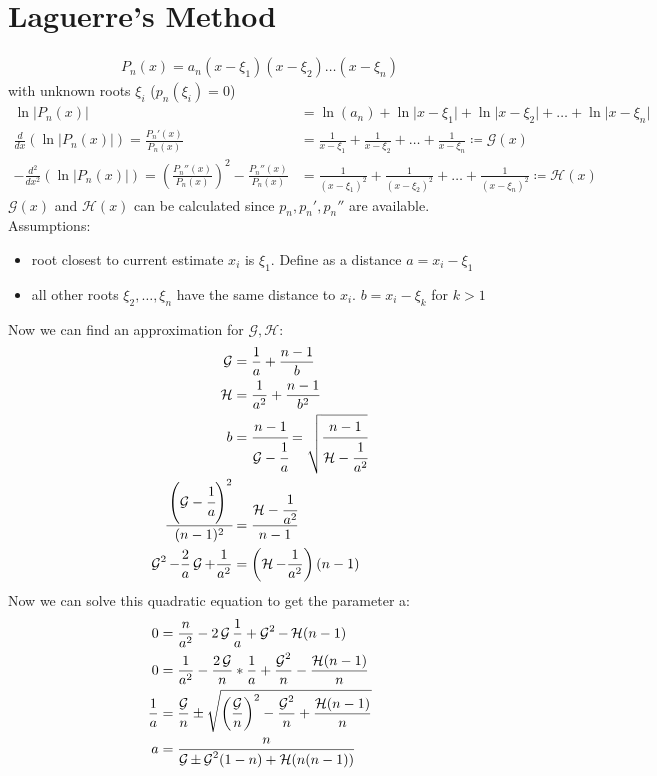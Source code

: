 \section{Laguerre's Method}\label{sec:laguerres-method}
\begin{align*}
    P_n(x) = a_n(x-\xi_1)(x-\xi_2)\ldots(x-\xi_n)
\end{align*}
with unknown roots $\xi_i$ ($p_n(\xi_i) = 0$)
\begin{align*}
    \ln | P_n(x) | &= \ln(a_n) + \ln \lvert x- \xi_1 \rvert + \ln \lvert x- \xi_2 \rvert
    +\ldots + \ln \lvert x- \xi_n \rvert\\
    \frac{d}{dx} \left( \ln \lvert P_n(x)\rvert \right) = \frac{P_n'(x)}{P_n(x)}
    &= \frac{1}{x-\xi_1}+\frac{1}{x-\xi_2}+ \ldots + \frac{1}{x-\xi_n} \coloneqq \mathcal{G}(x)\\
    -\frac{d^2}{dx^2}(\ln \lvert P_n(x) \rvert)= \left( \frac{P_n''(x)}{P_n(x)}\right)^2-\frac{P_n''(x)}{P_n(x)}
    &= \frac{1}{(x-\xi_1)^2}+\frac{1}{(x-\xi_2)^2}+\ldots+\frac{1}{(x-\xi_n)^2} \coloneqq \mathcal{H}(x)
\end{align*}
$\mathcal{G}(x)$ and $\mathcal{H}(x)$ can be calculated since $p_n, p_n', p_n''$ are available.
Assumptions:
\begin{itemize}
    \item root closest to current estimate $x_i$ is $\xi_1$.
    Define as a distance $a=x_i-\xi_1$
    \item all other roots $\xi_2, \ldots, \xi_n$ have the same distance to $x_i$. $b=x_i-\xi_k$ for $k>1$
\end{itemize}
Now we can find an approximation for $\mathcal{G}, \mathcal{H}$:
\begin{align*}
    \mathcal{G}&= \frac{1}{a}+ \frac{n-1}{b}\\
    \mathcal{H}&= \frac{1}{a^2}+\frac{n-1}{b^2}\\
    b &= \cfrac{n-1}{\mathcal{G}-\cfrac{1}{a}}= \sqrt{\cfrac{n-1}{\mathcal{H}-\cfrac{1}{a^2}}}\\
    \cfrac{\left(\mathcal{G}-\cfrac{1}{a} \right)^2}{(n-1)^2} &= \cfrac{\mathcal{H}- \cfrac{1}{a^2}}{n-1}\\
    \operatorname{\mathcal{G}}^2-\frac{2}{a}\operatorname{\mathcal{G}} + \frac{1}{a^2}&=\left(\operatorname{\mathcal{H}}-\frac{1}{a^2} \right)(n-1)\\
\end{align*}
Now we can solve this quadratic equation to get the parameter a:
\begin{align*}
    0 &=\frac{n}{a^2}-2 \operatorname{\mathcal{G}} \frac{1}{a}+ \operatorname{\mathcal{G}}^2- \operatorname{\mathcal{H}}(n-1)\\
    0 &= \frac{1}{a^2}- \frac{2 \operatorname{\mathcal{G}}}{n}*\frac{1}{a}+\frac{\operatorname{\mathcal{G}}^2}{n}-\frac{\operatorname{\mathcal{H}} (n-1)}{n}\\
    \frac{1}{a} &= \frac{\operatorname{\mathcal{G}}}{n} \pm \sqrt {\left(\frac{\operatorname{\mathcal{G}}}{n} \right)^2-\frac{\operatorname{\mathcal{G}}^2}{n}+ \frac{\operatorname{\mathcal{H}} (n-1)}{n}}\\
    a&=\frac{n}{\operatorname{\mathcal{G}} \pm \operatorname{\mathcal{G}}^2(1-n)+ \operatorname{\mathcal{H}} (n(n-1))}
\end{align*}
